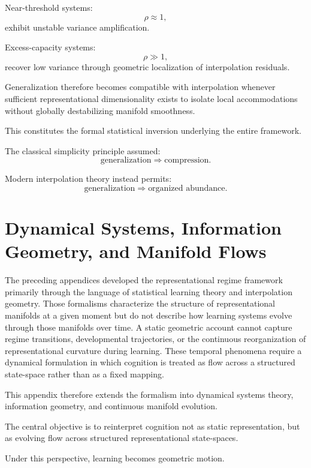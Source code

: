 \documentclass[12pt,a4paper]{article}
\begin{document}
Near-threshold systems:
\[
\rho
\approx
1,
\]
exhibit unstable variance amplification.

Excess-capacity systems:
\[
\rho
\gg
1,
\]
recover low variance through geometric localization of interpolation residuals.

Generalization therefore becomes compatible with interpolation whenever sufficient representational dimensionality exists to isolate local accommodations without globally destabilizing manifold smoothness.

This constitutes the formal statistical inversion underlying the entire framework.

The classical simplicity principle assumed:
\[
\text{generalization}
\Rightarrow
\text{compression}.
\]

Modern interpolation theory instead permits:
\[
\text{generalization}
\Rightarrow
\text{organized abundance}.
\]


\section{Dynamical Systems, Information Geometry, and Manifold Flows}

The preceding appendices developed the representational regime framework primarily through the language of statistical learning theory and interpolation geometry. Those formalisms characterize the structure of representational manifolds at a given moment but do not describe how learning systems evolve through those manifolds over time. A static geometric account cannot capture regime transitions, developmental trajectories, or the continuous reorganization of representational curvature during learning. These temporal phenomena require a dynamical formulation in which cognition is treated as flow across a structured state-space rather than as a fixed mapping.

This appendix therefore extends the formalism into dynamical systems theory, information geometry, and continuous manifold evolution.

The central objective is to reinterpret cognition not as static representation, but as evolving flow across structured representational state-spaces.

Under this perspective, learning becomes geometric motion.
\end{document}
